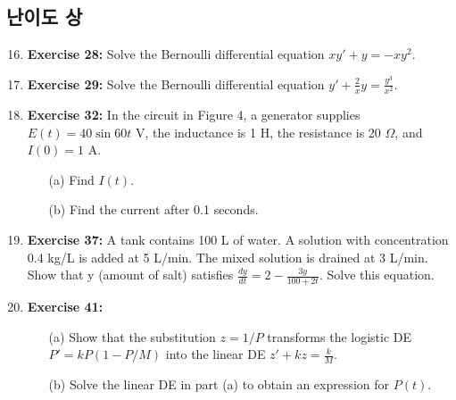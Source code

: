 \documentclass[12pt, a4paper]{article}
\begin{document}
\hrulefill
\vspace{1em}

\subsection*{난이도 상}
\begin{enumerate}
    \setcounter{enumi}{15} %
    \item \textbf{Exercise 28:} Solve the Bernoulli differential equation $xy' + y = -xy^2$.

    \item \textbf{Exercise 29:} Solve the Bernoulli differential equation $y' + \frac{2}{x}y = \frac{y^3}{x^2}$.

    \item \textbf{Exercise 32:} In the circuit in Figure 4, a generator supplies $E(t)=40 \sin 60t$ V, the inductance is 1 H, the resistance is 20 $\Omega$, and $I(0)=1$ A.
    \begin{itemize}
        \item[(a)] Find $I(t)$.
        \item[(b)] Find the current after 0.1 seconds.
    \end{itemize}

    \item \textbf{Exercise 37:} A tank contains 100 L of water. A solution with concentration 0.4 kg/L is added at 5 L/min. The mixed solution is drained at 3 L/min. Show that y (amount of salt) satisfies $\frac{dy}{dt}=2-\frac{3y}{100+2t}$. Solve this equation.

    \item \textbf{Exercise 41:}
    \begin{itemize}
        \item[(a)] Show that the substitution $z=1/P$ transforms the logistic DE $P'=kP(1-P/M)$ into the linear DE $z'+kz=\frac{k}{M}$.
        \item[(b)] Solve the linear DE in part (a) to obtain an expression for $P(t)$.
    \end{itemize}
\end{enumerate}
\end{document}
